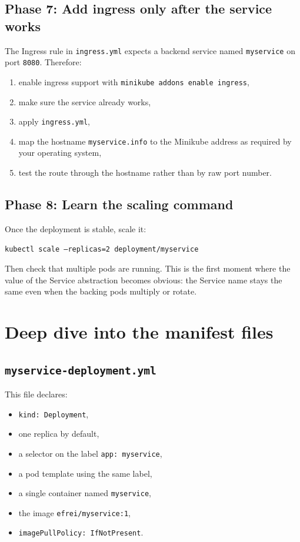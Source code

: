 \documentclass[11pt,a4paper]{article}
\newcommand{\pathitem}[1]{\texorpdfstring{\nolinkurl{#1}}{#1}}
\newcommand{\cmd}[1]{\texttt{#1}}
\begin{document}
\subsection{Phase 7: Add ingress only after the service works}

The Ingress rule in \pathitem{ingress.yml} expects a backend service named \cmd{myservice} on port \cmd{8080}. Therefore:

\begin{enumerate}
\item enable ingress support with \cmd{minikube addons enable ingress},
\item make sure the service already works,
\item apply \pathitem{ingress.yml},
\item map the hostname \cmd{myservice.info} to the Minikube address as required by your operating system,
\item test the route through the hostname rather than by raw port number.
\end{enumerate}

\subsection{Phase 8: Learn the scaling command}

Once the deployment is stable, scale it:

\begin{center}
\cmd{kubectl scale --replicas=2 deployment/myservice}
\end{center}

Then check that multiple pods are running. This is the first moment where the value of the Service abstraction becomes obvious: the Service name stays the same even when the backing pods multiply or rotate.

\section{Deep dive into the manifest files}

\subsection{\pathitem{myservice-deployment.yml}}

This file declares:

\begin{itemize}
\item \cmd{kind: Deployment},
\item one replica by default,
\item a selector on the label \cmd{app: myservice},
\item a pod template using the same label,
\item a single container named \cmd{myservice},
\item the image \cmd{efrei/myservice:1},
\item \cmd{imagePullPolicy: IfNotPresent}.
\end{itemize}
\end{document}
